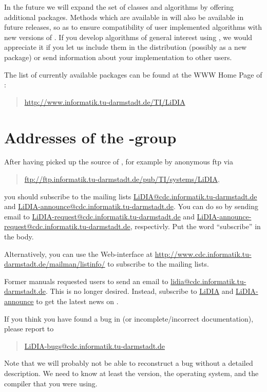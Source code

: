 In the future we will expand the set of classes and algorithms by offering additional packages.
Methods which are available in \LiDIAVersion will also be available in future releases, so as to
ensure compatibility of user implemented algorithms with new versions of \LiDIA.  If you develop
algorithms of general interest using \LiDIA, we would appreciate it if you let us include them
in the \LiDIA distribution (possibly as a new package) or send information about your
implementation to other \LiDIA users.

The list of currently available packages can be found at the \LiDIA WWW Home Page of \LiDIA:
\begin{quote}
  \url{http://www.informatik.tu-darmstadt.de/TI/LiDIA}
\end{quote}


\section{Addresses of the \LiDIA-group}

After having picked up the source of \LiDIAVersion, for example by anonymous ftp via
\begin{quote}
  \url{ftp://ftp.informatik.tu-darmstadt.de/pub/TI/systems/LiDIA},
\end{quote}
you should subscribe to the \LiDIA mailing lists \url{LiDIA@cdc.informatik.tu-darmstadt.de} and
\url{LiDIA-announce@cdc.informatik.tu-darmstadt.de}.  You can do so by sending email to
\url{LiDIA-request@cdc.informatik.tu-darmstadt.de} and
\url{LiDIA-announce-request@cdc.informatik.tu-darmstadt.de}, respectivly.  Put the word
``subscribe'' in the body.

Alternatively, you can use the Web-interface at
\url{http://www.cdc.informatik.tu-darmstadt.de/mailman/listinfo/} to subscribe to the \LiDIA
mailing lists.

\attentionI Former \LiDIA manuals requested \LiDIA users to send an email to
\url{lidia@cdc.informatik.tu-darmstadt.de}.  This is no longer desired.  Instead, subscribe to
\url{LiDIA} and \url{LiDIA-announce} to get the latest news on \LiDIA.

If you think you have found a bug in \LiDIA (or incomplete/incorrect documentation), please
report to
\begin{quote}
  \url{LiDIA-bugs@cdc.informatik.tu-darmstadt.de}
\end{quote}
Note that we will probably not be able to reconstruct a bug without a detailed
description.  We need to know at least the \LiDIA version, the operating system, and the
compiler that you were using.


